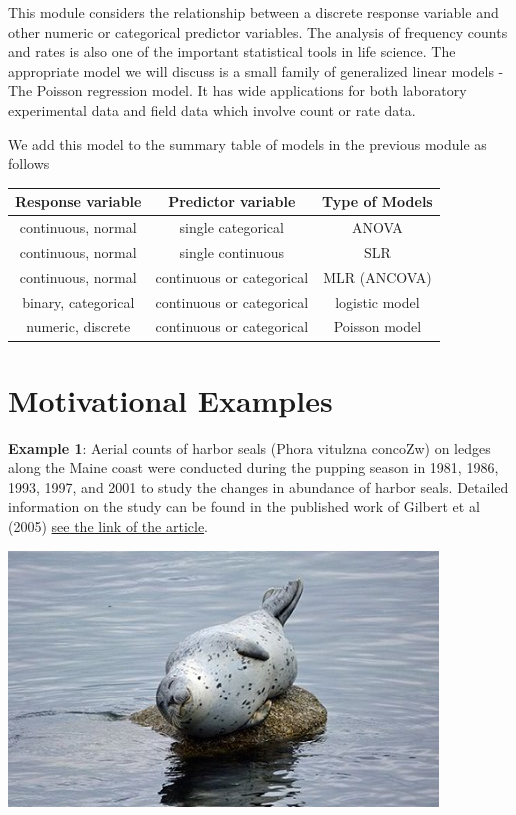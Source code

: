 \documentclass[
]{book}
\begin{document}
This module considers the relationship between a discrete response variable and other numeric or categorical predictor variables. The analysis of frequency counts and rates is also one of the important statistical tools in life science. The appropriate model we will discuss is a small family of generalized linear models - The Poisson regression model. It has wide applications for both laboratory experimental data and field data which involve count or rate data.

We add this model to the summary table of models in the previous module as follows

\begin{longtable}[]{@{}ccc@{}}
\toprule\noalign{}
Response variable & Predictor variable & Type of Models \\
\midrule\noalign{}
\endhead
\bottomrule\noalign{}
\endlastfoot
continuous, normal & single categorical & ANOVA \\
continuous, normal & single continuous & SLR \\
continuous, normal & continuous or categorical & MLR (ANCOVA) \\
binary, categorical & continuous or categorical & logistic model \\
numeric, discrete & continuous or categorical & Poisson model \\
\end{longtable}

\hypertarget{motivational-examples}{%
\section{Motivational Examples}\label{motivational-examples}}

\textbf{Example 1}: Aerial counts of harbor seals (Phora vitulzna concoZw) on ledges along the Maine coast were conducted during the pupping season in 1981, 1986, 1993, 1997, and 2001 to study the changes in abundance of harbor seals. Detailed information on the study can be found in the published work of Gilbert et al (2005) \href{https://stat501.s3.amazonaws.com/w13-CHANGES-IN-ABUNDANCE-OF-HARBOR.pdf}{see the link of the article}.

\begin{center}\includegraphics[width=0.8\linewidth]{img13/w13-HarborSeal} \end{center}
\end{document}
